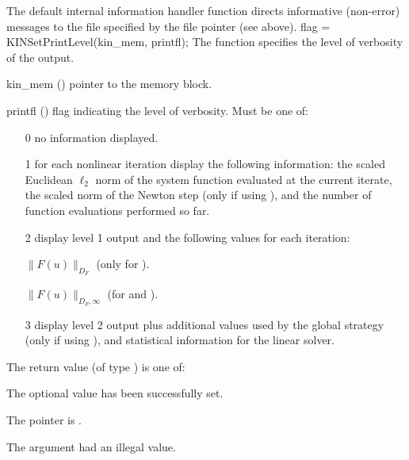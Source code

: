 {
  The default internal information handler function directs informative (non-error)
  messages to the file specified by the file pointer  (see
   above).
}
{
flag = KINSetPrintLevel(kin\_mem, printfl);
}
{
  The function  specifies the level of verbosity
  of the output.
}
{
  \begin{args}

  \item[kin\_mem] ()
    pointer to the {\kinsol} memory block.

  \item[printfl] ()
    flag indicating the level of verbosity. Must be one of:
    
    \begin{itemize}
    \item[0]
      no information displayed.
      
    \item[1]
      for each nonlinear iteration display
      the following information: the scaled
      Euclidean $\ell_2$ norm of the system function
      evaluated at the current iterate, the
      scaled norm of the Newton step (only if
      using ), and the
      number of function evaluations performed
      so far.
      
    \item[2]
      display level 1 output and the
      following values for each iteration:
      
      $\|F(u)\|_{D_F}$
      (only for ).
      
      $\|F(u)\|_{D_F,\infty}$
      (for  and
      ).
      
    \item[3]
      display level 2 output plus additional
      values used by the global strategy
      (only if using ), and
      statistical information for the linear
      solver.
    \end{itemize}

  \end{args}
}
{
  The return value  (of type ) is one of:
  \begin{args}
  \item[\Id{KIN\_SUCCESS}] 
    The optional value has been successfully set.
  \item[\Id{KIN\_MEM\_NULL}]
    The  pointer is .
  \item[\Id{KIN\_ILL\_INPUT}]
    The argument  had an illegal value.
  \end{args}
}
